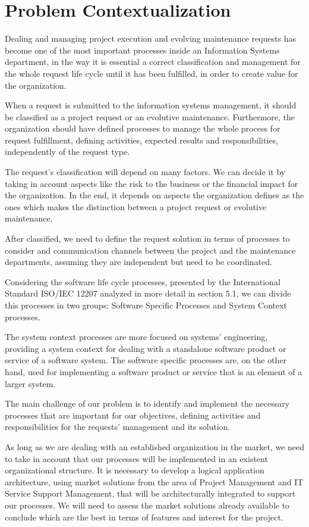 
% 
% 

\section{Problem Contextualization}


Dealing and managing project execution and evolving maintenance requests has become one of the most important processes inside an Information Systems department, in the way it is essential a correct classification and management for the whole request life cycle until it has been fulfilled, in order to create value for the organization.\par
When a request is submitted to the information systems management, it should be classified as a project request or an evolutive maintenance. Furthermore, the organization should have defined processes to manage the whole process for request fulfillment, defining activities, expected results and responsibilities, independently of the request type.\par
The request's classification will depend on many factors. We can decide it by taking in account aspects like the risk to the business or the financial impact for the organization. In the end, it depends on aspects the organization defines as the ones which makes the distinction between a project request or evolutive maintenance.\par
After classified, we need to define the request solution in terms of processes to consider and communication channels between the project and the maintenance departments, assuming they are independent but need to be coordinated.\par
Considering the software life cycle processes, presented by the International Standard ISO/IEC 12207\cite{ISO12207} analyzed in more detail in section 5.1, we can divide this processes in two groups: Software Specific Processes and System Context processes.\par
The system context processes are more focused on systems' engineering, providing a system context for dealing with a standalone software product or service of a software system. The software specific processes are, on the other hand, used for implementing a software product or service that is an element of a larger system. \par 
The main challenge of our problem is to identify and implement the necessary processes that are important for our objectives, defining activities and responsibilities for the requests' management and its solution.\par
As long as we are dealing with an established organization in the market, we need to take in account that our processes will be implemented in an existent organizational structure. It is necessary to develop a logical application architecture, using market solutions from the area of Project Management and IT Service Support Management, that will be architecturally integrated to support our processes. We will need to assess the market solutions already available to conclude which are the best in terms of features and interest for the project. 
